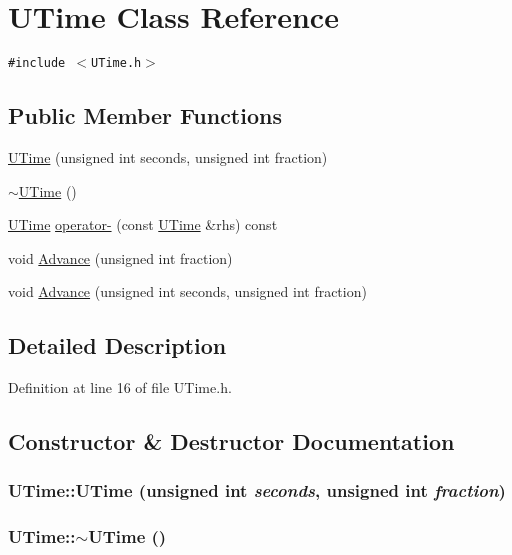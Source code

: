 \hypertarget{class_u_time}{
\section{UTime Class Reference}
\label{class_u_time}
}
{\tt \#include $<$UTime.h$>$}

\subsection*{Public Member Functions}
\begin{CompactItemize}
\item 
\hyperlink{class_u_time_85d7665b32189a2b519c8e90227d9449}{UTime} (unsigned int seconds, unsigned int fraction)
\item 
\hyperlink{class_u_time_59ea8d758a86d60dd9d42772e9e4def8}{$\sim$UTime} ()
\item 
\hyperlink{class_u_time}{UTime} \hyperlink{class_u_time_54c2c650fefff5a7eab2a35ff8391a17}{operator-} (const \hyperlink{class_u_time}{UTime} \&rhs) const 
\item 
void \hyperlink{class_u_time_4692044217515a78c8591f7a19089bd2}{Advance} (unsigned int fraction)
\item 
void \hyperlink{class_u_time_3a873fb7b8609348fbe0b0ce96b146eb}{Advance} (unsigned int seconds, unsigned int fraction)
\end{CompactItemize}


\subsection{Detailed Description}


Definition at line 16 of file UTime.h.

\subsection{Constructor \& Destructor Documentation}
\hypertarget{class_u_time_85d7665b32189a2b519c8e90227d9449}{
\subsubsection[{UTime}]{\setlength{\rightskip}{0pt plus 5cm}UTime::UTime (unsigned int {\em seconds}, \/  unsigned int {\em fraction})}}
\label{class_u_time_85d7665b32189a2b519c8e90227d9449}


\hypertarget{class_u_time_59ea8d758a86d60dd9d42772e9e4def8}{
\subsubsection[{$\sim$UTime}]{\setlength{\rightskip}{0pt plus 5cm}UTime::$\sim$UTime ()}}
\label{class_u_time_59ea8d758a86d60dd9d42772e9e4def8}




